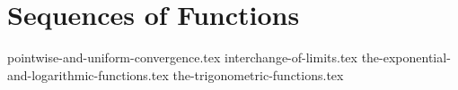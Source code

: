 \chapter{Sequences of Functions}
{pointwise-and-uniform-convergence.tex}
{interchange-of-limits.tex}
{the-exponential-and-logarithmic-functions.tex}
{the-trigonometric-functions.tex}
